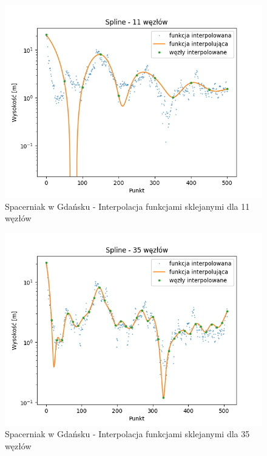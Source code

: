 \documentclass[12pt]{extarticle}
\begin{document}
\begin{figure}[H]
    \centering
    \includegraphics[scale=0.8]{interpolation_SpacerniakGdansk_Spline_11.png}
    \caption{Spacerniak w Gdańsku - Interpolacja funkcjami sklejanymi dla 11 węzłów}
\end{figure}
\begin{figure}[H]
    \centering
    \includegraphics[scale=0.8]{interpolation_SpacerniakGdansk_Spline_35.png}
    \caption{Spacerniak w Gdańsku - Interpolacja funkcjami sklejanymi dla 35 węzłów}
\end{figure}
\end{document}
